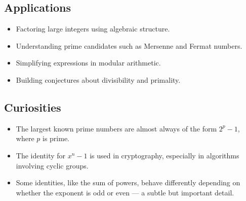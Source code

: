 \subsection{Applications}

\begin{itemize}
    \item Factoring large integers using algebraic structure.
    \item Understanding prime candidates such as Mersenne and Fermat numbers.
    \item Simplifying expressions in modular arithmetic.
    \item Building conjectures about divisibility and primality.
\end{itemize}

\subsection{Curiosities}

\begin{itemize}
    \item The largest known prime numbers are almost always of the form
    \(2^p - 1\), where \(p\) is prime.
    \item The identity for \(x^n - 1\) is used in cryptography, especially in
    algorithms involving cyclic groups.
    \item Some identities, like the sum of powers, behave differently depending
    on whether the exponent is odd or even — a subtle but important detail.
\end{itemize}
